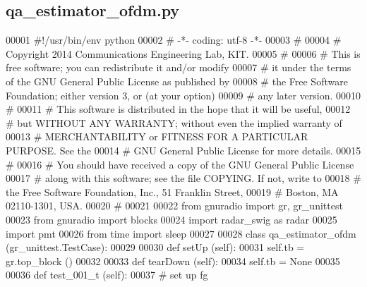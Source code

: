 \subsection{qa\+\_\+estimator\+\_\+ofdm.\+py}
\label{qa__estimator__ofdm_8py_source}

\begin{DoxyCode}
00001 \textcolor{comment}{#!/usr/bin/env python}
00002 \textcolor{comment}{# -*- coding: utf-8 -*-}
00003 \textcolor{comment}{# }
00004 \textcolor{comment}{# Copyright 2014 Communications Engineering Lab, KIT.}
00005 \textcolor{comment}{# }
00006 \textcolor{comment}{# This is free software; you can redistribute it and/or modify}
00007 \textcolor{comment}{# it under the terms of the GNU General Public License as published by}
00008 \textcolor{comment}{# the Free Software Foundation; either version 3, or (at your option)}
00009 \textcolor{comment}{# any later version.}
00010 \textcolor{comment}{# }
00011 \textcolor{comment}{# This software is distributed in the hope that it will be useful,}
00012 \textcolor{comment}{# but WITHOUT ANY WARRANTY; without even the implied warranty of}
00013 \textcolor{comment}{# MERCHANTABILITY or FITNESS FOR A PARTICULAR PURPOSE.  See the}
00014 \textcolor{comment}{# GNU General Public License for more details.}
00015 \textcolor{comment}{# }
00016 \textcolor{comment}{# You should have received a copy of the GNU General Public License}
00017 \textcolor{comment}{# along with this software; see the file COPYING.  If not, write to}
00018 \textcolor{comment}{# the Free Software Foundation, Inc., 51 Franklin Street,}
00019 \textcolor{comment}{# Boston, MA 02110-1301, USA.}
00020 \textcolor{comment}{# }
00021 
00022 \textcolor{keyword}{from} gnuradio \textcolor{keyword}{import} gr, gr\_unittest
00023 \textcolor{keyword}{from} gnuradio \textcolor{keyword}{import} blocks
00024 \textcolor{keyword}{import} radar\_swig \textcolor{keyword}{as} radar
00025 \textcolor{keyword}{import} pmt
00026 \textcolor{keyword}{from} time \textcolor{keyword}{import} sleep
00027 
00028 \textcolor{keyword}{class }qa_estimator_ofdm (gr\_unittest.TestCase):
00029 
00030     \textcolor{keyword}{def }setUp (self):
00031         self.tb = gr.top\_block ()
00032 
00033     \textcolor{keyword}{def }tearDown (self):
00034         self.tb = \textcolor{keywordtype}{None}
00035 
00036     \textcolor{keyword}{def }test_001_t (self):
00037         \textcolor{comment}{# set up fg}

\end{DoxyCode}
